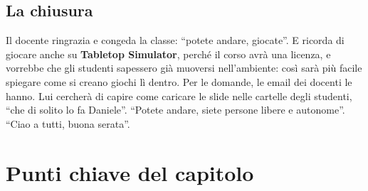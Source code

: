 \subsection{La chiusura}

Il docente ringrazia e congeda la classe: ``potete andare, giocate''. E ricorda
di giocare anche su \textbf{Tabletop Simulator}, perché il corso avrà una
licenza, e vorrebbe che gli studenti sapessero già muoversi nell'ambiente: così
sarà più facile spiegare come si creano giochi lì dentro. Per le domande, le
email dei docenti le hanno. Lui cercherà di capire come caricare le slide nelle
cartelle degli studenti, ``che di solito lo fa Daniele''. ``Potete andare, siete
persone libere e autonome''. ``Ciao a tutti, buona serata''.

\section*{Punti chiave del capitolo}

